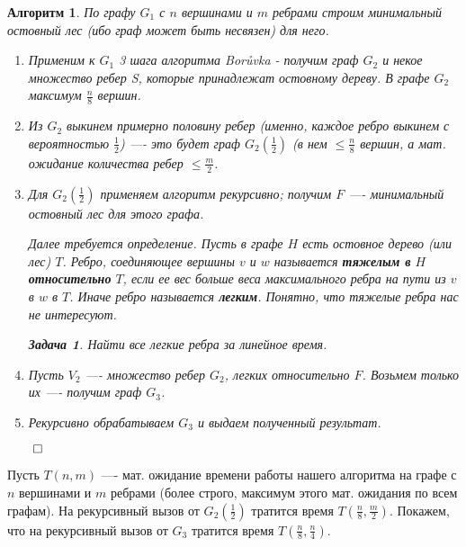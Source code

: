 \documentclass[a4paper]{article}
\theoremstyle{indented}
\newtheorem{alg}{Алгоритм}
\theoremstyle{definition}
\newtheorem{prob}{Задача}
\theoremstyle{remark}
\begin{document}
\begin{alg}
По графу $G_1$ с $n$ вершинами и $m$ ребрами
строим минимальный остовный лес (ибо граф может быть
несвязен) для него.

\begin{enumerate}
\item Применим к $G_1$ 3 шага алгоритма Bor{\r u}vka - получим граф $G_2$ и
некое множество ребер S, которые принадлежат остовному дереву. В
графе $G_2$ максимум $\frac{n}{8}$ вершин.

\item Из $G_2$ выкинем примерно половину ребер (именно, каждое ребро
выкинем с вероятностью $\frac{1}{2}$) —- это будет граф
$G_2(\frac{1}{2})$ (в нем $\le\frac{n}{8}$ вершин,
а мат. ожидание количества ребер $\le\frac{m}{2}$.

\item Для $G_2(\frac{1}{2})$ применяем алгоритм рекурсивно; получим $F$ —-
минимальный остовный лес для этого графа.

\begin{center}
\small
Далее требуется определение. Пусть в графе $H$ есть остовное
дерево (или лес) $T$. Ребро, соединяющее вершины $v$ и $w$
называется {\bf тяжелым в } $H$ {\bf относительно } $T$, если ее
вес больше веса максимального ребра на пути из $v$ в $w$ в $T$.
Иначе ребро называется {\bf легким}. Понятно, что тяжелые ребра
нас не интересуют.

\begin{prob}
Найти все легкие ребра за линейное время.
\end{prob}
\end{center}

\item Пусть $V_2$ —- множество ребер $G_2$, легких относительно $F$.
Возьмем только их —- получим граф $G_3$.

\item Рекурсивно обрабатываем $G_3$ и выдаем полученный результат.

\end{enumerate}
\hfill$\qed$
\end{alg}

Пусть $T(n,m)$ —- мат. ожидание времени работы нашего алгоритма
на графе с $n$ вершинами и $m$ ребрами (более строго, максимум
этого мат. ожидания по всем графам). На рекурсивный вызов от
$G_2(\frac{1}{2})$ тратится время $T(\frac{n}{8},\frac{m}{2})$.
Покажем, что на рекурсивный вызов от $G_3$ тратится время
$T(\frac{n}{8},\frac{n}{4})$. \\ 
\end{document}
